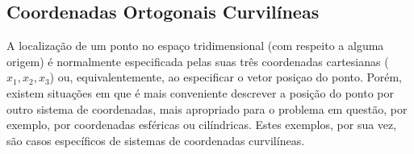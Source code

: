 \subsection {Coordenadas Ortogonais Curvil\'ineas}

A localiza\c{c}\~ao de um ponto no espa\c{c}o tridimensional
(com respeito a alguma origem) \'e normalmente especificada pelas
suas tr\^es coordenadas cartesianas ($x_1, x_2, x_3$) ou,
equivalentemente, ao especificar o vetor posi\c{c}ao do ponto.
Por\'em, existem situa\c{c}\~oes em que \'e mais conveniente
descrever a posi\c{c}\~ao do ponto por outro sistema
de coordenadas, mais apropriado para o problema em quest\~ao,
por exemplo, por coordenadas esf\'ericas ou cil\'indricas. Estes
exemplos, por sua vez, s\~ao casos espec\'ificos de sistemas
de coordenadas curvil\'ineas.

